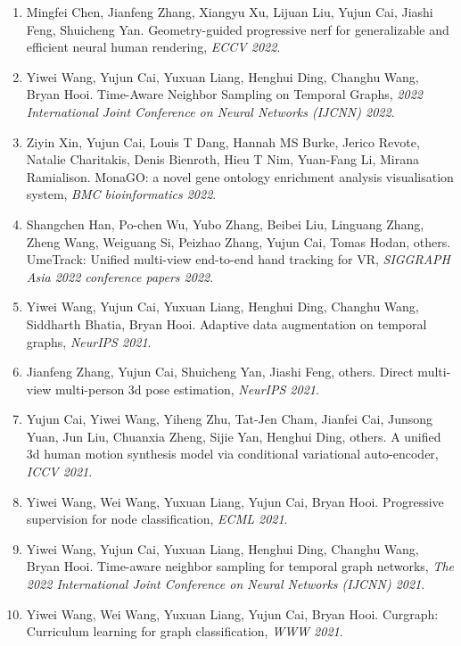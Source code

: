 \begin{enumerate}
\item Mingfei Chen, Jianfeng Zhang, Xiangyu Xu, Lijuan Liu, Yujun Cai, Jiashi Feng, Shuicheng Yan. Geometry-guided progressive nerf for generalizable and efficient neural human rendering, \textit{ECCV 2022}.

\item Yiwei Wang, Yujun Cai, Yuxuan Liang, Henghui Ding, Changhu Wang, Bryan Hooi. Time-Aware Neighbor Sampling on Temporal Graphs, \textit{2022 International Joint Conference on Neural Networks (IJCNN) 2022}.

\item Ziyin Xin, Yujun Cai, Louis T Dang, Hannah MS Burke, Jerico Revote, Natalie Charitakis, Denis Bienroth, Hieu T Nim, Yuan-Fang Li, Mirana Ramialison. MonaGO: a novel gene ontology enrichment analysis visualisation system, \textit{BMC bioinformatics 2022}.

\item Shangchen Han, Po-chen Wu, Yubo Zhang, Beibei Liu, Linguang Zhang, Zheng Wang, Weiguang Si, Peizhao Zhang, Yujun Cai, Tomas Hodan, others. UmeTrack: Unified multi-view end-to-end hand tracking for VR, \textit{SIGGRAPH Asia 2022 conference papers 2022}.

\item Yiwei Wang, Yujun Cai, Yuxuan Liang, Henghui Ding, Changhu Wang, Siddharth Bhatia, Bryan Hooi. Adaptive data augmentation on temporal graphs, \textit{NeurIPS 2021}.

\item Jianfeng Zhang, Yujun Cai, Shuicheng Yan, Jiashi Feng, others. Direct multi-view multi-person 3d pose estimation, \textit{NeurIPS 2021}.

\item Yujun Cai, Yiwei Wang, Yiheng Zhu, Tat-Jen Cham, Jianfei Cai, Junsong Yuan, Jun Liu, Chuanxia Zheng, Sijie Yan, Henghui Ding, others. A unified 3d human motion synthesis model via conditional variational auto-encoder, \textit{ICCV 2021}.

\item Yiwei Wang, Wei Wang, Yuxuan Liang, Yujun Cai, Bryan Hooi. Progressive supervision for node classification, \textit{ECML 2021}.

\item Yiwei Wang, Yujun Cai, Yuxuan Liang, Henghui Ding, Changhu Wang, Bryan Hooi. Time-aware neighbor sampling for temporal graph networks, \textit{The 2022 International Joint Conference on Neural Networks (IJCNN) 2021}.

\item Yiwei Wang, Wei Wang, Yuxuan Liang, Yujun Cai, Bryan Hooi. Curgraph: Curriculum learning for graph classification, \textit{WWW 2021}.


\end{enumerate}
